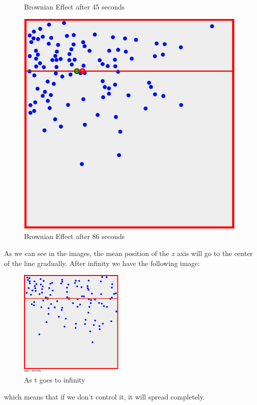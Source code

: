 \begin{itemize}
\begin{figure}[!htb]
  \caption{Brownian Effect after 45 seconds}
\endminipage\hfill
{}%
  \includegraphics[width=\linewidth]{fig/brownian2in86.png}
  \caption{Brownian Effect after 86 seconds}
\endminipage
\end{figure}
As we can see in the images, the mean position of the \emph{x} axis will go to the center of the line gradually. After infinity we have the following image:
\begin{figure}[h]
\begin{center}
\includegraphics[width=5cm]{fig/brownian2infinity.png}
\caption{As t goes to infinity}
\end{center}
\end{figure}

which means that if we don't control it, it will spread completely.


\end{itemize}
